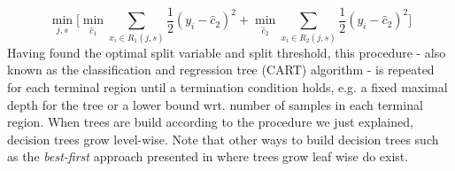 \begin{equation}\label{minjs}
	\min_{j,s} \bigg [\min_{\hat{c}_1} \sum_{x_i \in R_1(j,s)} \dfrac{1}{2}(y_i - \hat{c}_{2})^2 + \min_{\hat{c}_2} \sum_{x_i \in R_{2}(j,s)} \dfrac{1}{2}(y_i - \hat{c}_{2})^2\bigg]
\end{equation}
Having found the optimal split variable and split threshold, this procedure - also known as the classification and regression tree (CART) algorithm - is repeated for each terminal region until a termination condition holds, e.g. a fixed maximal depth for the tree or a lower bound wrt. number of samples in each terminal region. When trees are build according to the procedure we just explained, decision trees grow level-wise. Note that other ways to build decision trees such as the \textit{best-first} approach presented in \cite{BestFirst} where trees grow leaf wise do exist. 

